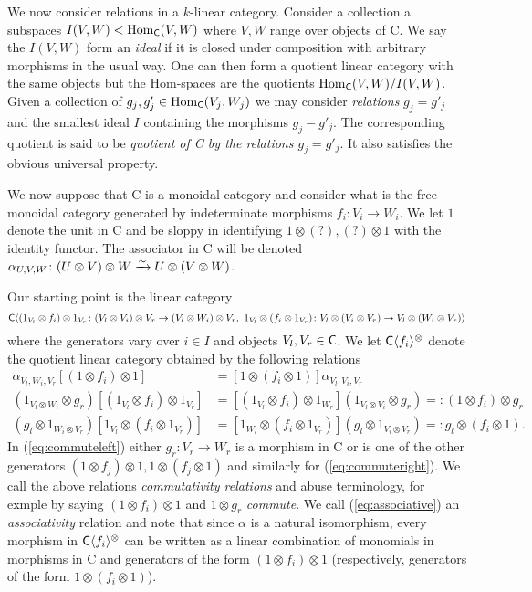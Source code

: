\documentclass[12pt]{amsart}
\begin{document}
We now consider relations in a $k$-linear category. Consider a collection a subspaces $I(V,W) < \operatorname{Hom}_{\sf C}(V,W)$ where $V,W$ range over objects of {\sf C}. We say the $I(V,W)$ form an {\em ideal} if it is closed under composition with arbitrary morphisms in the usual way. One can then form a quotient linear category with the same objects but the Hom-spaces are the quotients $\operatorname{Hom}_{\sf C}(V,W)/I(V,W)$. Given a collection of $g_j,g'_j \in \operatorname{Hom}_{\sf C}(V_j,W_j)$ we may consider {\em relations} $g_j = g'_j$ and the smallest ideal $I$ containing the morphisms $g_j - g'_j$. The corresponding quotient is said to be {\em quotient of {\sf C} by the relations $g_j = g'_j$}. It also satisfies the obvious universal property. 

We now suppose that {\sf C} is a monoidal category and consider what is the free monoidal category generated by indeterminate morphisms $f_i \colon V_i \to W_i$. We let $1$ denote the unit in {\sf C} and be sloppy in identifying $1 \otimes (?), (?) \otimes 1$ with the identity functor. The associator in {\sf C} will be denoted $\alpha_{U,V,W} \colon (U \otimes V) \otimes W \xrightarrow{\sim} U \otimes (V \otimes W)$. 

Our starting point is the linear category 
$${\sf C}\langle (1_{V_l} \otimes f_i) \otimes 1_{V_r}\colon (V_l \otimes V_i) \otimes V_r \to (V_l \otimes W_i) \otimes V_r,\ 1_{V_l} \otimes (f_i \otimes 1_{V_r})\colon V_l \otimes (V_i \otimes V_r) \to V_l \otimes (W_i \otimes V_r) \rangle
$$
where the generators vary over $i \in I$ and objects $V_l,V_r \in {\sf C}$. We let ${\sf C}\langle f_i\rangle^{\otimes}$ denote the quotient linear category obtained by the following relations
\begin{eqnarray}  
\label{eq:associative}
\alpha_{V_l,W_i,V_r} [(1 \otimes f_i) \otimes 1] & = [1 \otimes (f_i \otimes 1)] \alpha_{V_l,V_i,V_r}
\\
\label{eq:commuteleft}
(1_{V_l\otimes W_i} \otimes g_r) [(1_{V_l} \otimes f_i) \otimes 1_{V_r}] & =  [(1_{V_l} \otimes f_i) \otimes 1_{W_r}](1_{V_l \otimes V_i} \otimes g_r) =: (1 \otimes f_i) \otimes g_r
\\
\label{eq:commuteright}
(g_l \otimes 1_{W_i\otimes V_r}) [1_{V_l} \otimes (f_i \otimes 1_{V_r})] & =  [1_{W_l} \otimes (f_i \otimes 1_{V_r})](g_l \otimes 1_{V_i\otimes V_r}) =: g_l \otimes (f_i \otimes 1).
\end{eqnarray}
In (\ref{eq:commuteleft}) either $g_r \colon V_r \to W_r$ is a morphism in {\sf C} or is one of the other generators $(1 \otimes f_j) \otimes 1,1 \otimes (f_j \otimes 1)$ and similarly for (\ref{eq:commuteright}). We call the above relations {\em commutativity relations} and abuse terminology, for exmple by saying $(1 \otimes f_i) \otimes 1$ and $1 \otimes g_r$ {\em commute}. We call (\ref{eq:associative}) an {\em associativity} relation and note that since $\alpha$ is a natural isomorphism, every morphism in ${\sf C}\langle f_i \rangle ^{\otimes}$ can be written as a linear combination of monomials in morphisms in {\sf C} and generators of the form $(1 \otimes f_i) \otimes 1$ (respectively, generators of the form $1 \otimes (f_i \otimes 1)$).
\end{document}
